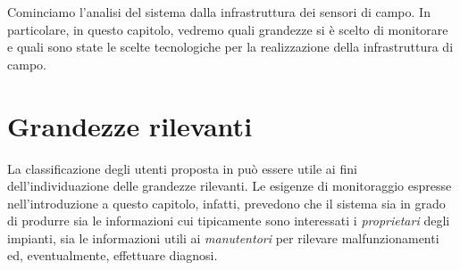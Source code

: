 %
Cominciamo l'analisi del sistema dalla infrastruttura dei sensori di campo.
%
In particolare, in questo capitolo, vedremo quali grandezze si \`e scelto di monitorare
e quali sono state le scelte tecnologiche per la realizzazione della infrastruttura di campo.
%

%
\section{Grandezze rilevanti}
\label{sec:grandezze-rilevanti}
%
La classificazione degli utenti proposta in \cite{kolodenny08} pu\`o essere utile ai 
fini dell'individuazione delle grandezze rilevanti. Le esigenze di monitoraggio 
espresse nell'introduzione a questo capitolo, infatti, prevedono che il sistema 
sia in grado di produrre sia le informazioni cui tipicamente sono interessati i 
\emph{proprietari} degli impianti, sia le informazioni utili ai \emph{manutentori} 
per rilevare malfunzionamenti ed, eventualmente, effettuare diagnosi.
%

